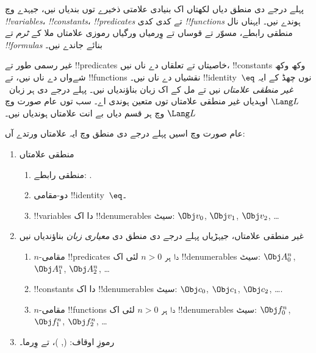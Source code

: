 \documentclass[../../../include/open-logic-section]{subfiles}
\begin{document}



پہلے درجے دی منطق دیاں لکھتاں اک بنیادی علامتی ذخیرے توں بندیاں نیں،
جیہدے وچ \emph{!!{variable}s}، \emph{!!{constant}s}،
\emph{!!{predicate}s} تے کدی کدی \emph{!!{function}s} ہوندے نیں۔
ایہناں نال منطقی رابطے، مسوّر تے قوساں تے وِرمیاں ورگیاں
رموزی علامتاں ملا کے \emph{ٹرم} تے \emph{!!{formula}s}
بنائے جاندے نیں۔

\begin{explain}
غیر رسمی طور تے !!{predicate}s خاصیتاں تے تعلقاں دے ناں نیں،
!!{constant}s وکھ وکھ شےواں دے ناں نیں، تے !!{function}s
نقشیاں دے ناں نیں۔ !!{identity}~$\eq$ نوں چھڈ کے ایہ
\emph{غیر منطقی علامتاں} نیں تے مل کے اک زبان بناؤندیاں نیں۔
پہلے درجے دی ہر زبان~$\Lang L$ اوہدیاں غیر منطقی
علامتاں توں متعین ہوندی اے۔ سب توں عام صورت وچ
$\Lang L$ وچ ہر قسم دیاں بے انت علامتاں ہوندیاں نیں۔
\end{explain}

عام صورت وچ اسیں پہلے درجے دی منطق وچ ایہ علامتاں ورتدے آں:

\begin{enumerate}
\item منطقی علامتاں
\begin{enumerate}
\item منطقی رابطے:
  \startycommalist
  .
\item دو-مقامی !!{identity}~$\eq$۔
\item !!{variable}s دا اک !!{denumerable}s سیٹ: $\Obj v_0$, $\Obj v_1$, $\Obj
  v_2$, \dots
\end{enumerate}
\item غیر منطقی علامتاں، جیہڑیاں پہلے درجے دی منطق دی
\emph{معیاری زبان} بناؤندیاں نیں
\begin{enumerate}
\item $n$-مقامی !!{predicate}s دا ہر $n>0$ لئی اک !!{denumerable}s سیٹ: $\Obj
  A^n_0$, $\Obj A^n_1$, $\Obj A^n_2$, \dots
\item !!{constant}s دا اک !!{denumerable}s سیٹ: $\Obj c_0$, $\Obj c_1$, $\Obj
  c_2$, \dots.
\item $n$-مقامی !!{function}s دا ہر $n>0$ لئی اک !!{denumerable}s سیٹ:
  $\Obj f^n_0$, $\Obj f^n_1$, $\Obj f^n_2$, \dots
\end{enumerate}
\item رموزِ اوقاف: (, )، تے وِرما۔
\end{enumerate}
\end{document}
